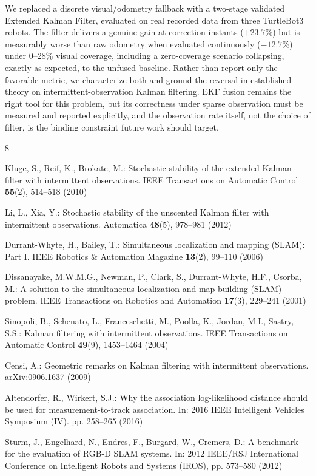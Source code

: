 \documentclass[runningheads]{llncs}
\renewcommand{\paragraph}[1]{\vspace{4pt}\noindent{\em #1}\enspace}
\begin{document}
\paragraph{Conclusion.}
We replaced a discrete visual/odometry fallback with a two-stage
validated Extended Kalman Filter, evaluated on real recorded data from
three TurtleBot3 robots. The filter delivers a genuine gain at
correction instants ($+23.7\%$) but is measurably worse than raw
odometry when evaluated continuously ($-12.7\%$) under 0--28\% visual
coverage, including a zero-coverage scenario collapsing, exactly as
expected, to the unfused baseline. Rather than report only the
favorable metric, we characterize both and ground the reversal in
established theory on intermittent-observation Kalman filtering. EKF
fusion remains the right tool for this problem, but its correctness
under sparse observation must be measured and reported explicitly,
and the observation rate itself, not the choice of filter, is the
binding constraint future work should target.

\begin{thebibliography}{8}
\setlength{\itemsep}{0pt}
\setlength{\parskip}{2pt}

Kluge, S., Reif, K., Brokate, M.: Stochastic stability of the extended
Kalman filter with intermittent observations. IEEE Transactions on
Automatic Control \textbf{55}(2), 514--518 (2010)

Li, L., Xia, Y.: Stochastic stability of the unscented Kalman filter
with intermittent observations. Automatica \textbf{48}(5), 978--981
(2012)

Durrant-Whyte, H., Bailey, T.: Simultaneous localization and mapping
(SLAM): Part I. IEEE Robotics \& Automation Magazine \textbf{13}(2),
99--110 (2006)

Dissanayake, M.W.M.G., Newman, P., Clark, S., Durrant-Whyte, H.F.,
Csorba, M.: A solution to the simultaneous localization and map building
(SLAM) problem. IEEE Transactions on Robotics and Automation
\textbf{17}(3), 229--241 (2001)

Sinopoli, B., Schenato, L., Franceschetti, M., Poolla, K., Jordan, M.I.,
Sastry, S.S.: Kalman filtering with intermittent observations. IEEE
Transactions on Automatic Control \textbf{49}(9), 1453--1464 (2004)

Censi, A.: Geometric remarks on Kalman filtering with intermittent
observations. arXiv:0906.1637 (2009)

Altendorfer, R., Wirkert, S.J.: Why the association log-likelihood
distance should be used for measurement-to-track association. In: 2016
IEEE Intelligent Vehicles Symposium (IV). pp. 258--265 (2016)

Sturm, J., Engelhard, N., Endres, F., Burgard, W., Cremers, D.: A
benchmark for the evaluation of RGB-D SLAM systems. In: 2012 IEEE/RSJ
International Conference on Intelligent Robots and Systems (IROS),
pp. 573--580 (2012)

\end{thebibliography}
\end{document}
